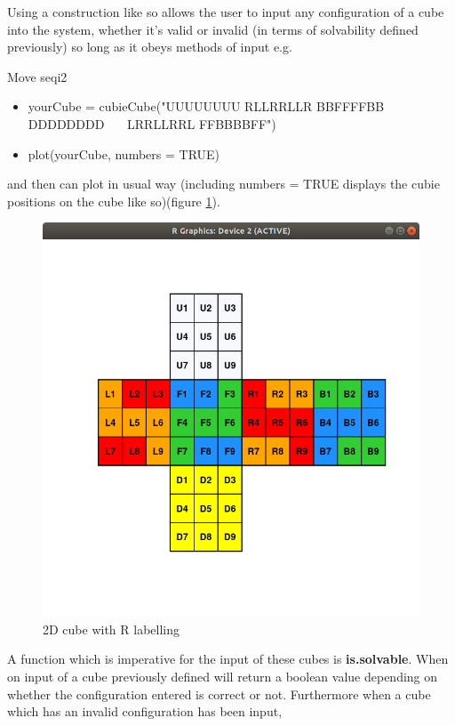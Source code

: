 \documentclass{article}
\begin{document}
\newpage
Using a construction like so allows the user to input any configuration of a cube into the system, whether it's valid or invalid (in terms of solvability defined previously) so long as it obeys methods of input e.g.



\begin{myinput}{Move seq}{i2}
\begin{itemize}
\item yourCube = cubieCube("UUUUUUUU RLLRRLLR BBFFFFBB DDDDDDDD \ \ \ LRRLLRRL FFBBBBFF")
\item plot(yourCube, numbers = TRUE)
\end{itemize}
\end{myinput}

and then can plot in usual way (including numbers = TRUE displays the cubie positions on the cube like so)(figure \ref{fig:labelled}).
\begin{figure}[h]
	\centering
	\includegraphics[scale=.5]{labelledcube.png}
	\caption{2D cube with R labelling}				    
	\label{fig:labelled}
\end{figure}
\newpage
A function which is imperative for the input of these cubes is \textbf{is.solvable}. When on input of a cube previously defined will return a boolean value depending on whether the configuration entered is correct or not.
Furthermore when a cube which has an invalid configuration has been input, 
%
\end{document}
